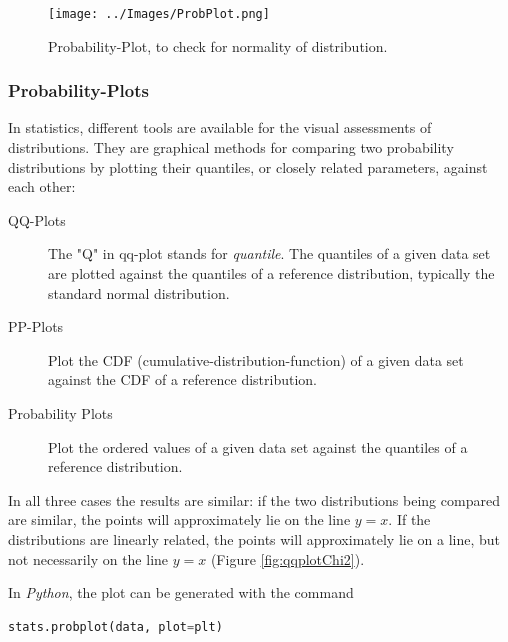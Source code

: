 \begin{figure}
  \centering
  \texttt{[image: ../Images/ProbPlot.png]}\\
  \caption{Probability-Plot, to check for normality of distribution.}\label{fig:qqplot}
\end{figure}


\subsubsection{Probability-Plots} 

In statistics, different tools are available for the visual assessments of distributions. They are graphical methods for comparing two probability distributions by plotting their \glspl{quantile}, or closely related parameters, against each other:

\begin{description}
  \item[QQ-Plots] The "Q" in \acrfull{qq-plot} stands for \emph{quantile}. The quantiles of a given data set are plotted against the quantiles of a reference distribution, typically the standard normal distribution.
  \item[PP-Plots]  Plot the CDF (cumulative-distribution-function) of a given data set against the CDF of a reference distribution.
  \item[Probability Plots]  Plot the ordered values of a given data set against the quantiles of a reference distribution.
\end{description}

In all three cases the results are similar: if the two distributions being compared are similar, the points will approximately lie on the line $y = x$. If the distributions are linearly related, the points will approximately lie on a line, but not necessarily on the line $y = x$ (Figure \ref{fig:qqplotChi2}).

In \emph{Python}, the plot can be generated with the command

\begin{lstlisting}[language=Python]
    stats.probplot(data, plot=plt)
\end{lstlisting}

